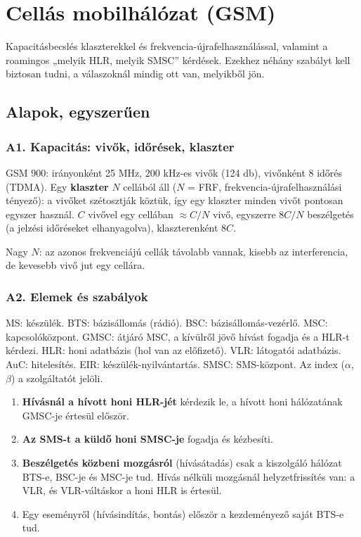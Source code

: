 \setcounter{chapter}{9}
\chapter{\texorpdfstring{Cellás mobilhálózat (GSM)}{Cellás mobilhálózat (GSM)}}\label{f10}
Kapacitásbecslés klaszterekkel és frekvencia-újrafelhasználással, valamint a roamingos „melyik HLR, melyik SMSC” kérdések. Ezekhez néhány szabályt kell biztosan tudni, a válaszoknál mindig ott van, melyikből jön.

\section{Alapok, egyszerűen}
\subsection{\texorpdfstring{A1. Kapacitás: vivők, időrések, klaszter}{A1. Kapacitás: vivők, időrések, klaszter}}\label{a10-kapacitas}
GSM 900: irányonként 25 MHz, 200 kHz-es vivők (124 db), vivőnként 8 időrés (TDMA). Egy \textbf{klaszter} $N$ cellából áll ($N$ = FRF, frekvencia-újrafelhasználási tényező): a vivőket szétosztják köztük, így egy klaszter minden vivőt pontosan egyszer használ. $C$ vivővel egy cellában $\approx C/N$ vivő, egyszerre $8C/N$ beszélgetés (a jelzési időréseket elhanyagolva), klaszterenként $8C$.

Nagy $N$: az azonos frekvenciájú cellák távolabb vannak, kisebb az interferencia, de kevesebb vivő jut egy cellára.

\subsection{\texorpdfstring{A2. Elemek és szabályok}{A2. Elemek és szabályok}}\label{a10-roaming}
MS: készülék. BTS: bázisállomás (rádió). BSC: bázisállomás-vezérlő. MSC: kapcsolóközpont. GMSC: átjáró MSC, a kívülről jövő hívást fogadja és a HLR-t kérdezi. HLR: honi adatbázis (hol van az előfizető). VLR: látogatói adatbázis. AuC: hitelesítés. EIR: készülék-nyilvántartás. SMSC: SMS-központ. Az index ($\alpha$, $\beta$) a szolgáltatót jelöli.

\begin{enumerate}
\item \textbf{Hívásnál a hívott honi HLR-jét} kérdezik le, a hívott honi hálózatának GMSC-je értesül először.
\item \textbf{Az SMS-t a küldő honi SMSC-je} fogadja és kézbesíti.
\item \textbf{Beszélgetés közbeni mozgásról} (hívásátadás) csak a kiszolgáló hálózat BTS-e, BSC-je és MSC-je tud. Hívás nélküli mozgásnál helyzetfrissítés van: a VLR, és VLR-váltáskor a honi HLR is értesül.
\item Egy eseményről (hívásindítás, bontás) először a kezdeményező saját BTS-e tud.
\end{enumerate}


